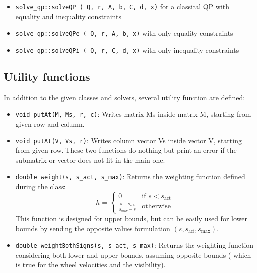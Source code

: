 \documentclass{ecnreport}
\begin{document}
\begin{itemize}
 \item \texttt{solve\_qp::solveQP ( Q, r, A, b, C, d, x)} for a classical QP with equality and inequality constraints
 \item  \texttt{solve\_qp::solveQPe ( Q, r, A, b, x)} with only equality constraints
 \item  \texttt{solve\_qp::solveQPi ( Q, r, C, d, x)} with only inequality constraints
\end{itemize}


\subsection{Utility functions}

In addition to the given classes and solvers, several utility function are defined:
\begin{itemize}
 \item \texttt{void putAt(M, Ms, r, c)}: Writes matrix Ms inside matrix M, starting from given row and column.
 \item \texttt{void putAt(V, Vs, r)}: Writes column vector Vs inside vector V, starting from given row. These two functions do nothing but print an error
 if the submatrix or vector does not fit in the main one.
 \item \texttt{double weight(s, s\_act, s\_max)}: Returns the weighting function defined during the class:
 \begin{equation*}
  h = \left\{\begin{array}{cl}
              0 & \text{if } s < s_{\text{act}} \\
              \displaystyle \frac{s-s_{\text{act}}}{s_{\max}-s} & \text{otherwise}
             \end{array}\right.
 \end{equation*}This function is designed for upper bounds, but can be easily used for lower bounds by sending the opposite values formulation
 $(s,s_{\text{act}}, s_{\max})$.
\item \texttt{double weightBothSigns(s, s\_act, s\_max)}: Returns the weighting function considering both lower and upper bounds, assuming opposite bounds (
which is true for the wheel velocities and the visibility).
\end{itemize}
\end{document}
